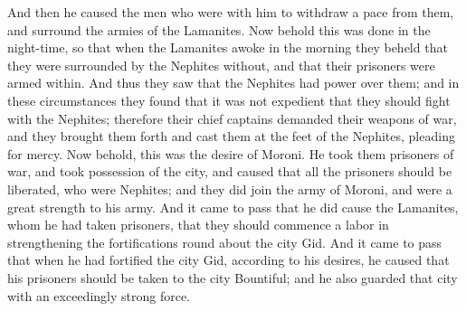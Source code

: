 \bverse \iffalse And then he caused the men who were with him to withdraw a pace from them, and surround the armies of the Lamanites. \fi
And then he caused the men who were with him to withdraw a pace from them, and surround the armies of the Lamanites.
\bverse \iffalse Now behold this was done in the night-time, so that when the Lamanites awoke in the morning they beheld that they were surrounded by the Nephites without, and that their prisoners were armed within. \fi
Now behold this was done in the night-time, so that when the Lamanites awoke in the morning they beheld that they were surrounded by the Nephites without, and that their prisoners were armed within.
\bverse \iffalse And thus they saw that the Nephites had power over them; and in these circumstances they found that it was not expedient that they should fight with the Nephites; therefore their chief captains demanded their weapons of war, and they brought them forth and cast them at the feet of the Nephites, pleading for mercy. \fi
And thus they saw that the Nephites had power over them; and in these circumstances they found that it was not expedient that they should fight with the Nephites; therefore their chief captains demanded their weapons of war, and they brought them forth and cast them at the feet of the Nephites, pleading for mercy.
\bverse \iffalse Now behold, this was the desire of Moroni. He took them prisoners of war, and took possession of the city, and caused that all the prisoners should be liberated, who were Nephites; and they did join the army of Moroni, and were a great strength to his army. \fi
Now behold, this was the desire of Moroni. He took them prisoners of war, and took possession of the city, and caused that all the prisoners should be liberated, who were Nephites; and they did join the army of Moroni, and were a great strength to his army.
\bverse \iffalse And it came to pass that he did cause the Lamanites, whom he had taken prisoners, that they should commence a labor in strengthening the fortifications round about the city Gid. \fi
And it came to pass that he did cause the Lamanites, whom he had taken prisoners, that they should commence a labor in strengthening the fortifications round about the city Gid.
\bverse \iffalse And it came to pass that when he had fortified the city Gid, according to his desires, he caused that his prisoners should be taken to the city Bountiful; and he also guarded that city with an exceedingly strong force. \fi
And it came to pass that when he had fortified the city Gid, according to his desires, he caused that his prisoners should be taken to the city Bountiful; and he also guarded that city with an exceedingly strong force.
